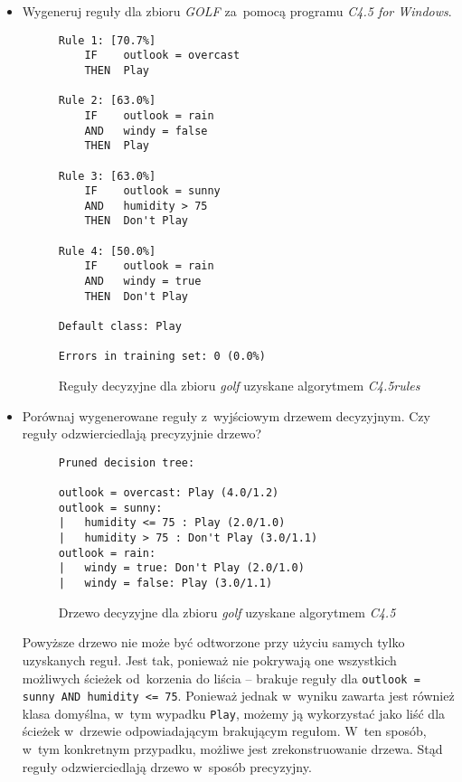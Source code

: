 \documentclass{article}
\begin{document}
\begin{itemize}
\item Wygeneruj reguły dla zbioru \emph{GOLF} za~pomocą programu \emph{C4.5 for Windows}.

\begin{figure}
\begin{verbatim}
Rule 1: [70.7%]
    IF    outlook = overcast
    THEN  Play

Rule 2: [63.0%]
    IF    outlook = rain
    AND   windy = false
    THEN  Play

Rule 3: [63.0%]
    IF    outlook = sunny
    AND   humidity > 75
    THEN  Don't Play

Rule 4: [50.0%]
    IF    outlook = rain
    AND   windy = true
    THEN  Don't Play

Default class: Play

Errors in training set: 0 (0.0%)
\end{verbatim}
\caption{Reguły decyzyjne dla zbioru \emph{golf} uzyskane algorytmem \emph{C4.5rules}}
\label{p2t1-rules}
\end{figure}

\item Porównaj wygenerowane reguły z~wyjściowym drzewem decyzyjnym. Czy reguły odzwierciedlają precyzyjnie drzewo?

\begin{figure}
\begin{verbatim}
Pruned decision tree:

outlook = overcast: Play (4.0/1.2)
outlook = sunny:
|   humidity <= 75 : Play (2.0/1.0)
|   humidity > 75 : Don't Play (3.0/1.1)
outlook = rain:
|   windy = true: Don't Play (2.0/1.0)
|   windy = false: Play (3.0/1.1)
\end{verbatim}
\caption{Drzewo decyzyjne dla zbioru \emph{golf} uzyskane algorytmem \emph{C4.5}}
\label{p2t1-tree}
\end{figure}

Powyższe drzewo nie może być odtworzone przy użyciu samych tylko uzyskanych reguł. Jest tak, ponieważ nie pokrywają one wszystkich możliwych ścieżek od~korzenia do liścia -- brakuje reguły dla \texttt{outlook = sunny AND humidity <= 75}. Ponieważ jednak w~wyniku zawarta jest również klasa domyślna, w~tym wypadku \texttt{Play}, możemy ją wykorzystać jako liść dla ścieżek w~drzewie odpowiadającym brakującym regułom. W~ten sposób, w~tym konkretnym przypadku, możliwe jest zrekonstruowanie drzewa. Stąd reguły odzwierciedlają drzewo w~sposób precyzyjny.
\end{itemize}
\end{document}
